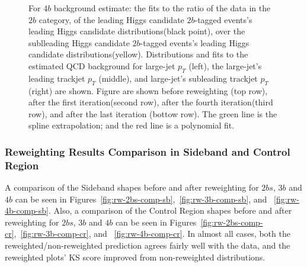 \begin{figure}[htbp!]
\begin{center}
\caption{For $4b$ background estimate: the fits to the ratio of the data in the $2b$ category, of the leading Higgs candidate $2b$-tagged events's leading Higgs candidate distributions(black point), over the sublleading Higgs candidate $2b$-tagged events's leading Higgs candidate distributions(yellow). Distributions and fits to the estimated QCD background for large-\R jet $p_{T}$ (left),  the large-\R jet's leading trackjet $p_T$ (middle), and large-\R jet's subleading trackjet $p_T$ (right) are shown.  Figure are shown before reweighting (top row), after the first iteration(second row), after the fourth iteration(third row), and after the last iteration (bottow row). The green line is the spline extrapolation; and the red line is a polynomial fit.}
\label{fig:rw-4b-subl}
\end{center}
\end{figure}


\pagebreak{}
\subsubsection{Reweighting Results Comparison in Sideband and Control Region}
\label{sec:boosted-Reweight-compare}

A comparison of the Sideband shapes before and after reweighting for $2bs$, $3b$ and $4b$ can be seen in Figures~\ref{fig:rw-2bs-comp-sb},~\ref{fig:rw-3b-comp-sb}, and ~\ref{fig:rw-4b-comp-sb}. Also, a comparison of the Control Region shapes before and after reweighting for $2bs$, $3b$ and $4b$ can be seen in Figures~\ref{fig:rw-2bs-comp-cr},~\ref{fig:rw-3b-comp-cr}, and ~\ref{fig:rw-4b-comp-cr}. In almost all cases, both the reweighted/non-reweighted prediction agrees fairly well with the data, and the reweighted plots' KS score improved from non-reweighted distributions. 

